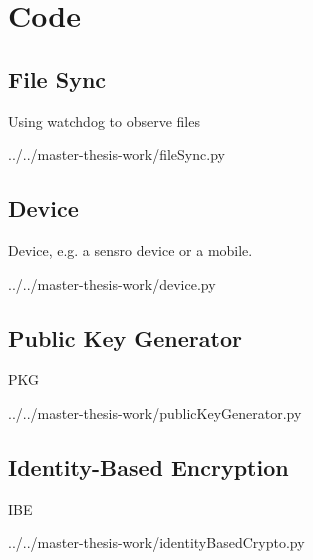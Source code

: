 \chapter{Code}\label{apx:code}


\section{File Sync}\label{apx:file-sync-code}

Using watchdog to observe files

\begin{lstinputlisting}
[language=Python]{../../master-thesis-work/fileSync.py}
\end{lstinputlisting}

\section{Device}\label{apx:device-code}

Device, e.g. a sensro device or a mobile.

\begin{lstinputlisting}
[language=Python]{../../master-thesis-work/device.py}
\end{lstinputlisting}

\section{Public Key Generator}\label{apx:pkg-code}

\gls{PKG}

\begin{lstinputlisting}
[language=Python]{../../master-thesis-work/publicKeyGenerator.py}
\end{lstinputlisting}

\section{Identity-Based Encryption}\label{apx:ibe-code}

\gls{IBE}

\begin{lstinputlisting}
[language=Python]{../../master-thesis-work/identityBasedCrypto.py}
\end{lstinputlisting}

